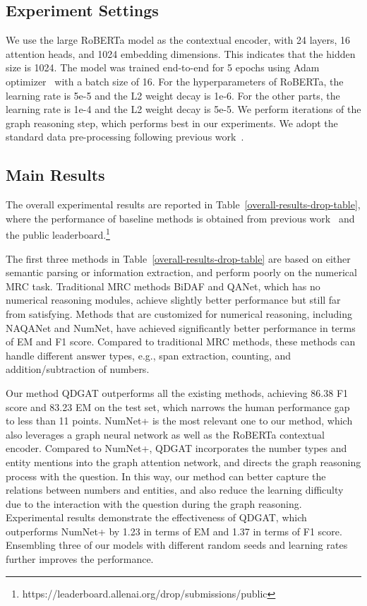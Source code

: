 \documentclass{article}
\begin{document}
\subsection{Experiment Settings}
We use the large RoBERTa model as the contextual encoder, with 24 layers, 16 attention heads, and 1024 embedding dimensions.
This indicates that the hidden size  is 1024.
The model was trained end-to-end for 5 epochs using Adam optimizer~\cite{DBLP:journals/corr/KingmaB14} with a batch size of 16.
For the hyperparameters of RoBERTa, the learning rate is 5e-5 and the L2 weight decay is 1e-6.
For the other parts, the learning rate is 1e-4 and the L2 weight decay is 5e-5.
We perform  iterations of the graph reasoning step, which performs best in our experiments.
We adopt the standard data pre-processing following previous work~\cite{DBLP:conf/emnlp/RanLLZL19}.


\subsection{Main Results}
The overall experimental results are reported in Table~\ref{overall-results-drop-table}, where the performance of baseline methods is obtained from previous work~\cite{DBLP:conf/naacl/DuaWDSS019,Seo2017Bidirectional,DBLP:conf/emnlp/RanLLZL19,DBLP:conf/emnlp/AndorHLP19} and
the public leaderboard.\footnote{https://leaderboard.allenai.org/drop/submissions/public}

The first three methods in Table~\ref{overall-results-drop-table} are based on either semantic parsing or information extraction, and perform poorly on the numerical MRC task.
Traditional MRC methods BiDAF and QANet, which has no numerical reasoning modules, achieve slightly better performance but still far from satisfying.
Methods that are customized for numerical reasoning, including NAQANet and NumNet, have achieved significantly better performance in terms of EM and F1 score. Compared to traditional MRC methods, these methods can handle different answer types, e.g., span extraction, counting, and addition/subtraction of numbers.




Our method QDGAT outperforms all the existing methods, achieving 86.38 F1 score and 83.23 EM on the test set, which narrows the human performance gap to less than 11 points.
NumNet+ is the most relevant one to our method, which also leverages a graph neural network as well as the RoBERTa contextual encoder. Compared to NumNet+, QDGAT incorporates the number types and entity mentions into the graph attention network, and directs the graph reasoning process with the question. In this way, our method can better capture the relations between numbers and entities, and also reduce the learning difficulty due to the interaction with the question during the graph reasoning.
Experimental results demonstrate the effectiveness of QDGAT, which outperforms NumNet+ by 1.23 in terms of EM and 1.37 in terms of F1 score.
Ensembling three of our models with different random seeds and learning rates further improves the performance.
\end{document}
